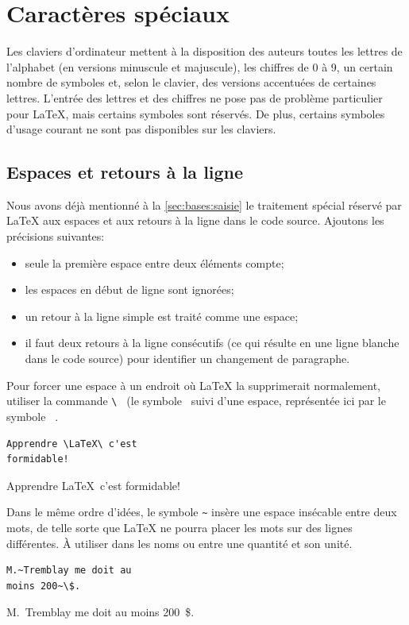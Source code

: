 \section{Caractères spéciaux}
\label{sec:bases:caracteres}

Les claviers d'ordinateur mettent à la disposition des auteurs toutes
les lettres de l'alphabet (en versions minuscule et majuscule), les
chiffres de 0 à 9, un certain nombre de symboles et, selon le clavier,
des versions accentuées de certaines lettres. L'entrée des lettres et
des chiffres ne pose pas de problème particulier pour {\LaTeX}, mais
certains symboles sont réservés. De plus, certains symboles d'usage
courant ne sont pas disponibles sur les claviers.

\subsection{Espaces et retours à la ligne}
\label{sec:bases:caracteres:espaces}

Nous avons déjà mentionné à la \autoref{sec:bases:saisie} le
traitement spécial réservé par {\LaTeX} aux espaces et aux retours à
la ligne dans le code source. Ajoutons les précisions suivantes:
\begin{itemize}
\item seule la première espace entre deux éléments compte;
\item les espaces en début de ligne sont ignorées;
\item un retour à la ligne simple est traité comme une espace;
\item il faut deux retours à la ligne consécutifs (ce qui résulte en
  une ligne blanche dans le code source) pour identifier un changement
  de paragraphe.
\end{itemize}

Pour forcer une espace à un endroit où {\LaTeX} la supprimerait
normalement, utiliser la commande \verb*=\ = (le symbole \bs\ suivi
d'une espace, représentée ici par le symbole \verb*| |.
\begin{demo}
  \begin{texample}
\begin{lstlisting}
Apprendre \LaTeX\ c'est
formidable!
\end{lstlisting}
    \producing
    Apprendre \LaTeX\ c'est
    formidable!
  \end{texample}
\end{demo}

Dans le même ordre d'idées, le symbole \verb=~= insère une espace
insécable entre deux mots, de telle sorte que {\LaTeX} ne pourra
placer les mots sur des lignes différentes. À utiliser dans les noms ou
entre une quantité et son unité.
\begin{demo}
  \begin{texample}
\begin{lstlisting}
M.~Tremblay me doit au
moins 200~\$.
\end{lstlisting}
    \producing
    M.~Tremblay me doit au moins 200~\$.
  \end{texample}
\end{demo}

